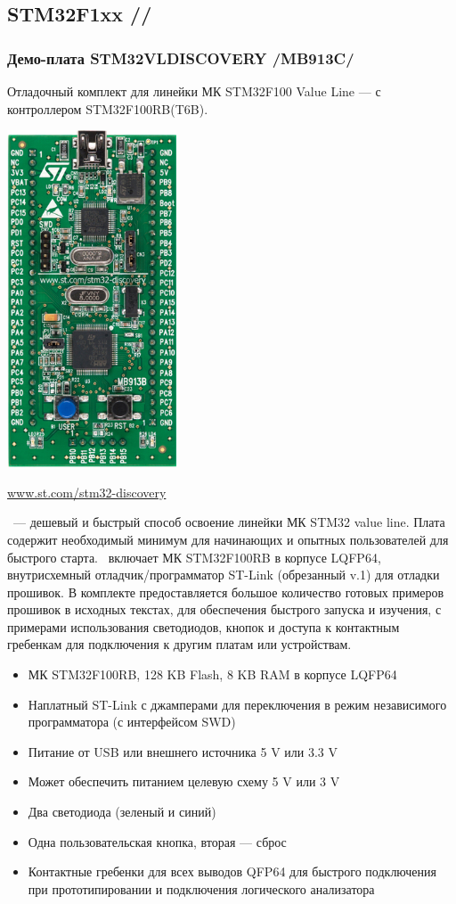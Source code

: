 \subsection{STM32F1xx //} 

\subsubsection{Демо-плата STM32VLDISCOVERY /MB913C/}

Отладочный комплект для линейки МК STM32F100 Value Line
--- с контроллером STM32F100RB(T6B).

\bigskip
\includegraphics[height=10cm]{fig/STM32VLDISCOVERY.jpg}
\bigskip

\url{www.st.com/stm32-discovery}
\bigskip

\vld\ --- дешевый и быстрый способ освоение линейки МК STM32 
value line. 
Плата содержит необходимый минимум для начинающих и опытных пользователей
для быстрого старта.
\vld\ включает МК STM32F100RB в корпусе LQFP64, внутрисхемный 
отладчик/программатор ST-Link (обрезанный v.1) для отладки прошивок.
В комплекте предоставляется большое количество готовых примеров прошивок
в исходных текстах, для обеспечения быстрого запуска и изучения, с примерами
использования светодиодов, кнопок и доступа к контактным гребенкам
для подключения к другим платам или устройствам.

\bigskip
\begin{itemize}
\item МК STM32F100RB, 128 KB Flash, 8 KB RAM в корпусе LQFP64
\item Наплатный ST-Link с джамперами для переключения в режим независимого 
программатора (с интерфейсом SWD)
\item Питание от USB или внешнего источника 5 V или 3.3 V
\item Может обеспечить питанием целевую схему 5 V или 3 V
\item Два светодиода (зеленый и синий)
\item Одна пользовательская кнопка, вторая --- сброс
\item Контактные гребенки для всех выводов QFP64 для быстрого подключения
при прототипировании и подключения логического анализатора
\end{itemize}
